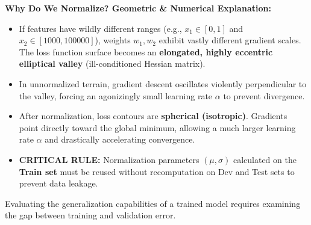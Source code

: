 \documentclass[10pt,a4paper]{article}
\begin{document}
\begin{tcolorbox}[
    colframe=accentred, colback=white, arc=1.3mm, boxrule=0.5pt,
    left=5pt, right=5pt, top=2pt, bottom=2pt
]
\footnotesize
\textbf{Why Do We Normalize? Geometric \& Numerical Explanation:}
\begin{itemize}[leftmargin=8pt, itemsep=0.5pt, topsep=0pt]
    \item If features have wildly different ranges (e.g., $x_1 \in [0, 1]$ and $x_2 \in [1000, 100000]$), weights $w_1, w_2$ exhibit vastly different gradient scales. The loss function surface becomes an \textbf{elongated, highly eccentric elliptical valley} (ill-conditioned Hessian matrix).
    \item In unnormalized terrain, gradient descent oscillates violently perpendicular to the valley, forcing an agonizingly small learning rate $\alpha$ to prevent divergence.
    \item After normalization, loss contours are \textbf{spherical (isotropic)}. Gradients point directly toward the global minimum, allowing a much larger learning rate $\alpha$ and drastically accelerating convergence.
    \item \textbf{CRITICAL RULE:} Normalization parameters $(\mu, \sigma)$ calculated on the \textbf{Train set} must be reused without recomputation on Dev and Test sets to prevent data leakage.
\end{itemize}
\end{tcolorbox}

\newpage


\par\vspace{1pt}
Evaluating the generalization capabilities of a trained model requires examining the gap between training and validation error.
\end{document}

